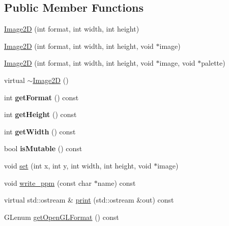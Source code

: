 \subsection*{Public Member Functions}
\begin{CompactItemize}
\item 
\hyperlink{classm3g_1_1Image2D_cea21be298c6584490d2b714c4b29d6b}{Image2D} (int format, int width, int height)
\item 
\hyperlink{classm3g_1_1Image2D_8cf9a47f24ed50fe66686c1117fb048c}{Image2D} (int format, int width, int height, void $\ast$image)
\item 
\hyperlink{classm3g_1_1Image2D_f498914ceac20ff9b1708c55ff1484e6}{Image2D} (int format, int width, int height, void $\ast$image, void $\ast$palette)
\item 
virtual \hyperlink{classm3g_1_1Image2D_7ac703fe7edbb053dd2246ea1bb43200}{$\sim$Image2D} ()
\item 
\hypertarget{classm3g_1_1Image2D_c08e2752176d267cc4429d4d185975b8}{
int \textbf{getFormat} () const }
\label{classm3g_1_1Image2D_c08e2752176d267cc4429d4d185975b8}

\item 
\hypertarget{classm3g_1_1Image2D_317329daf960a1759801c0f16d43d5a3}{
int \textbf{getHeight} () const }
\label{classm3g_1_1Image2D_317329daf960a1759801c0f16d43d5a3}

\item 
\hypertarget{classm3g_1_1Image2D_f149cb053bc8b5fbc1364b5dbb934488}{
int \textbf{getWidth} () const }
\label{classm3g_1_1Image2D_f149cb053bc8b5fbc1364b5dbb934488}

\item 
\hypertarget{classm3g_1_1Image2D_d687aabba553d1c66bfc253ec7e5bd05}{
bool \textbf{isMutable} () const }
\label{classm3g_1_1Image2D_d687aabba553d1c66bfc253ec7e5bd05}

\item 
void \hyperlink{classm3g_1_1Image2D_fe9ef1abefb9e92b38687e27c9004bdc}{set} (int x, int y, int width, int height, void $\ast$image)
\item 
void \hyperlink{classm3g_1_1Image2D_6ec48e0681b8805c75ecadf4ba4a40cb}{write\_\-ppm} (const char $\ast$name) const 
\item 
virtual std::ostream \& \hyperlink{classm3g_1_1Image2D_6fea17fa1532df3794f8cb39cb4f911f}{print} (std::ostream \&out) const 
\item 
GLenum \hyperlink{classm3g_1_1Image2D_7923da2fe82fee768ec9937a693e843c}{getOpenGLFormat} () const 
\end{CompactItemize}
